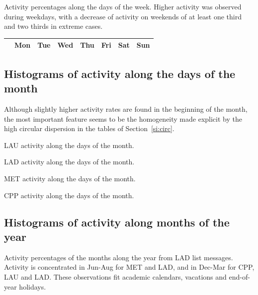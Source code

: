 \documentclass[%
 aip,
 jmp,%
 amsmath,amssymb,
 reprint,%
 floatfix,
]{revtex4-1}
\begin{document}
Activity percentages along the days of the week. Higher activity was observed during weekdays, with a decrease of activity on weekends of at least one third and two thirds in extreme cases.

\begin{table}[!h]
\begin{center}
    \begin{tabular}{ | l |  c | c | c | c | c |   c | c |}
        \hline
        & Mon & Tue & Wed & Thu & Fri & Sat & Sun  \\ \hline
	
    \end{tabular}
\end{center}
\label{tab:win}
\end{table}

\FloatBarrier
\subsection{Histograms of activity along the days of the month}
Although slightly higher activity rates are found in the beginning of the month, the most important feature seems to be the homogeneity made explicit by the high circular dispersion in the tables of Section~\ref{si:circ}.
\begin{table}[!h]
	\caption{LAU activity along the days of the month.}
	\footnotesize
	
\label{tab:min}
\end{table}
\begin{table}[!h]
	\caption{LAD activity along the days of the month.}
	\footnotesize
	
\label{tab:min}
\end{table}
\begin{table}[!h]
	\caption{MET activity along the days of the month.}
	\footnotesize
	
\label{tab:min}
\end{table}
\begin{table}[!h]
	\caption{CPP activity along the days of the month.}
	\footnotesize
	
\label{tab:min}
\end{table}

\FloatBarrier
\subsection{Histograms of activity along months of the year}
	Activity percentages of the months along the year from LAD list messages. Activity is concentrated in Jun-Aug for MET and LAD, and in Dec-Mar for CPP, LAU and LAD. These observations fit academic calendars, vacations and end-of-year holidays.
\end{document}
